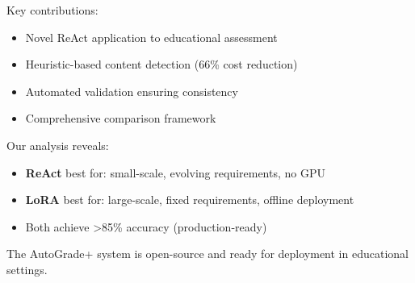 \documentclass[runningheads]{llncs}
\begin{document}
Key contributions:
\begin{itemize}
    \item Novel ReAct application to educational assessment
    \item Heuristic-based content detection (66\% cost reduction)
    \item Automated validation ensuring consistency
    \item Comprehensive comparison framework
\end{itemize}

Our analysis reveals:
\begin{itemize}
    \item \textbf{ReAct} best for: small-scale, evolving requirements, no GPU
    \item \textbf{LoRA} best for: large-scale, fixed requirements, offline deployment
    \item Both achieve >85\% accuracy (production-ready)
\end{itemize}

The AutoGrade+ system is open-source and ready for deployment in educational settings.
\end{document}
